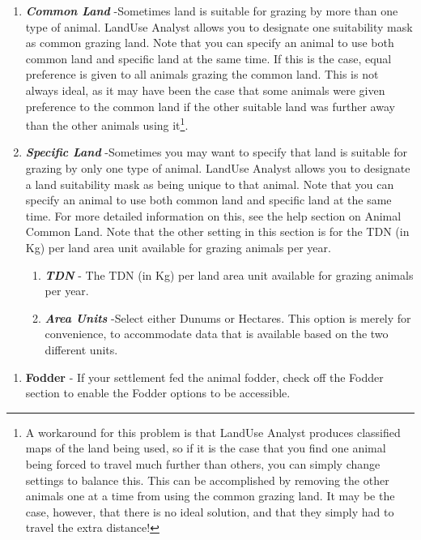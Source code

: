 \begin{enumerate}
      \begin{enumerate}
        \item \textit{\textbf{Common Land}} -Sometimes land is suitable for
grazing by more than one type of animal. LandUse Analyst allows you to designate
one suitability mask as common grazing land. Note that you can specify an animal
to use both common land and specific land at the same time. If this is the case,
equal preference is given to all animals grazing the common land. This is not
always ideal, as it may have been the case that some animals were given
preference to the common land if the other suitable land was further away than
the other animals using it\footnote{A workaround for this problem is that
LandUse Analyst produces classified maps of the land being used, so if it is the
case that you find one animal being forced to travel much further than others,
you can simply change settings to balance this. This can be accomplished by
removing the other animals one at a time from using the common grazing land. It
may be the case, however, that there is no ideal solution, and that they simply
had to travel the extra distance!}.
        \item \textit{\textbf{Specific Land}} -Sometimes you may want to specify
that land is suitable for grazing by only one type of animal. LandUse Analyst
allows you to designate a land suitability mask as being unique to that animal.
Note that you can specify an animal to use both common land and specific land at
the same time. For more detailed information on this, see the help section on
Animal Common Land.   Note that the other setting in this section is for the TDN
(in Kg) per land area unit available for grazing animals per year.
          \begin{enumerate}
            \item \textit{\textbf{TDN}} - The TDN (in Kg) per land area unit
available for grazing animals per year.
            \item \textit{\textbf{Area Units}} -Select either Dunums or
Hectares. This option is merely for convenience, to accommodate data that is
available based on the two different units.
          \end{enumerate}
      \end{enumerate}
  \begin{enumerate}
    \item \textbf{Fodder} - If your settlement fed the animal fodder, check off
the Fodder section to enable the Fodder options to be accessible. 
      \begin{enumerate}

\end{enumerate}
\end{enumerate}
\end{enumerate}
